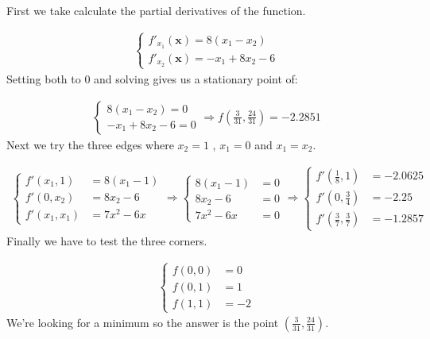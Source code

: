 \documentclass{article}
\begin{document}
First we take calculate the partial derivatives of the function.

\begin{align*}
  \begin{cases}
    f'_{x_1}(\mathbf{x}) = 8 (x_1 - x_2) \\
    f'_{x_2}(\mathbf{x}) = - x_1 + 8 x_2 - 6
  \end{cases}
\end{align*}
Setting both to $0$ and solving gives us a stationary point of:

\begin{align*}
  \begin{cases}
    8 (x_1 - x_2)     = 0 \\
    - x_1 + 8 x_2 - 6 = 0
  \end{cases}
  \Rightarrow f\left(\frac{3}{31}, \frac{24}{31} \right) = -2.2851
\end{align*}
Next we try the three edges where $x_2 = 1$ , $ x_1 = 0$ and $ x_1 = x_2$.

\begin{align*}
  \begin{cases}
    f'(x_1, 1)   &= 8 (x_1 - 1) \\
    f'(0, x_2)   &= 8 x_2 - 6 \\
    f'(x_1, x_1) &= 7 x^2 - 6x
  \end{cases}
  \Rightarrow
  \begin{cases}
    8 (x_1 - 1) &= 0 \\
    8 x_2 - 6   &= 0 \\
    7 x^2 - 6x  &= 0
  \end{cases}
  \Rightarrow
  \begin{cases}
    f'\left(\frac{1}{8}, 1 \right)           &= -2.0625 \\
    f'\left(0, \frac{3}{4} \right)           &= -2.25   \\
    f'\left(\frac{3}{7}, \frac{3}{7} \right) &= -1.2857
  \end{cases}
\end{align*}
Finally we have to test the three corners.

\begin{align*}
  \begin{cases}
    f(0,0) &= 0 \\
    f(0,1) &= 1 \\
    f(1,1) &= -2
  \end{cases}
\end{align*}
We're looking for a minimum so the answer is the point $\left(\frac{3}{31}, \frac{24}{31} \right)$.
\end{document}
